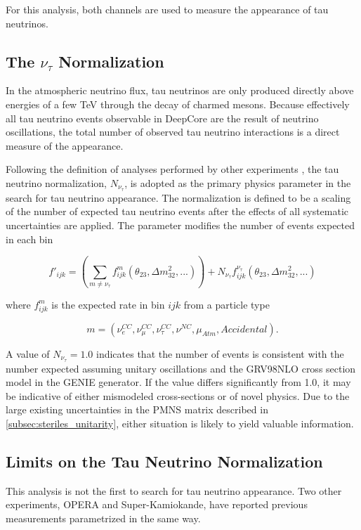 For this analysis, both channels are used to measure the appearance of tau neutrinos.

\label{subsec:norm_tau}
\subsection{The $\nu_{\tau}$ Normalization}
In the atmospheric neutrino flux, tau neutrinos are only produced directly above energies of a few TeV through the decay of charmed mesons.
Because effectively all tau neutrino events observable in DeepCore are the result of neutrino oscillations, the total number of observed tau neutrino interactions is a direct measure of the appearance.

Following the definition of analyses performed by other experiments \cite{SuperK-Tau2013,SuperK-Tau2017,OPERA-Tau2015}, the tau neutrino normalization, $N_{\nu_\tau}$, is adopted as the primary physics parameter in the search for tau neutrino appearance.
The normalization is defined to be a scaling of the number of expected tau neutrino events after the effects of all systematic uncertainties are applied.
The parameter modifies the number of events expected in each bin 

\label{eqn:norm_tau_definition}
\begin{equation}
	f'_{ijk} = \left( \sum_{m\neq\nu_\tau} f^m_{ijk}\left(\theta_{23}, \Delta m_{32}^2, ...\right) \right) + N_{\nu_\tau} f^{\nu_\tau}_{ijk}\left(\theta_{23}, \Delta m_{32}^2, ...\right) 
\end{equation}

where $f^m_{ijk}$ is the expected rate in bin $ijk$ from a particle type 

\begin{equation}
m=(\nu^{CC}_e, \nu^{CC}_\mu, \nu^{CC}_\tau,\nu^{NC}, \mu_{Atm}, Accidental) .
\end{equation}

A value of $N_{\nu_\tau}=1.0$ indicates that the number of events is consistent with the number expected assuming unitary oscillations and the GRV98NLO cross section model in the GENIE generator.
If the value differs significantly from 1.0, it may be indicative of either mismodeled cross-sections \cite{Description-DsTau,SuperK-Tau2017} or of novel physics\cite{Tau-NuDecay}. 
Due to the large existing uncertainties in the PMNS matrix described in \ref{subsec:steriles_unitarity}, either situation is likely to yield valuable information.


\label{subsec:superk_and_opera}
\subsection{Limits on the Tau Neutrino Normalization}
This analysis is not the first to search for tau neutrino appearance.
Two other experiments, OPERA and Super-Kamiokande, have reported previous measurements parametrized in the same way.

